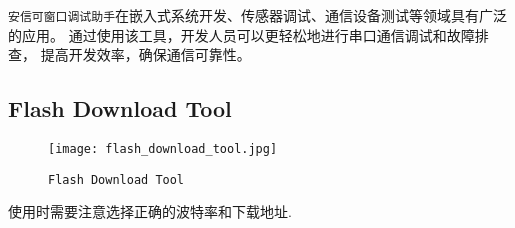 \documentclass[../main.tex]{subfiles}
\begin{document}
\texttt{安信可窗口调试助手}在嵌入式系统开发、传感器调试、通信设备测试等领域具有广泛的应用。
通过使用该工具，开发人员可以更轻松地进行串口通信调试和故障排查，
提高开发效率，确保通信可靠性。
\subsection*{Flash Download Tool}
\begin{figure}[H]
  \begin{center}
    \texttt{[image: flash\_download\_tool.jpg]}
  \end{center}
  \caption{\texttt{Flash Download Tool}}
\end{figure}
%
使用时需要注意选择正确的波特率和下载地址.
%
\end{document}
